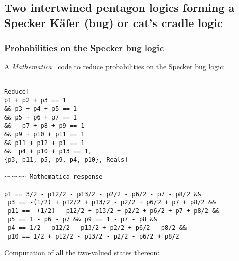 \documentclass[%
 showpacs,
 showkeys,
 preprintnumbers,
 amsmath,amssymb,
 aps,
  pra,
  longbibliography,
 floatfix,
 ]{revtex4-1}
\begin{document}
\subsection{Two intertwined pentagon logics forming a Specker K\"afer (bug) or cat's cradle logic}

\subsubsection{Probabilities on the Specker bug logic}

A {\em Mathematica}~\cite{Mathematica11.1} code to reduce probabilities on the Specker bug logic:


{ \begin{lstlisting}[backgroundcolor=\color{yellow!10},framerule=0pt,breaklines=true, frame=tb]

Reduce[
p1 + p2 + p3 == 1
&& p3 + p4 + p5 == 1
&& p5 + p6 + p7 == 1
&&   p7 + p8 + p9 == 1
&& p9 + p10 + p11 == 1
&& p11 + p12 + p1 == 1
&&  p4 + p10 + p13 == 1,
{p3, p11, p5, p9, p4, p10}, Reals]

~~~~~~ Mathematica response

p1 == 3/2 - p12/2 - p13/2 - p2/2 - p6/2 - p7 - p8/2 &&
 p3 == -(1/2) + p12/2 + p13/2 - p2/2 + p6/2 + p7 + p8/2 &&
 p11 == -(1/2) - p12/2 + p13/2 + p2/2 + p6/2 + p7 + p8/2 &&
 p5 == 1 - p6 - p7 && p9 == 1 - p7 - p8 &&
 p4 == 1/2 - p12/2 - p13/2 + p2/2 + p6/2 - p8/2 &&
 p10 == 1/2 + p12/2 - p13/2 - p2/2 - p6/2 + p8/2

\end{lstlisting}  }

Computation of all the two-valued states thereon:
\end{document}

